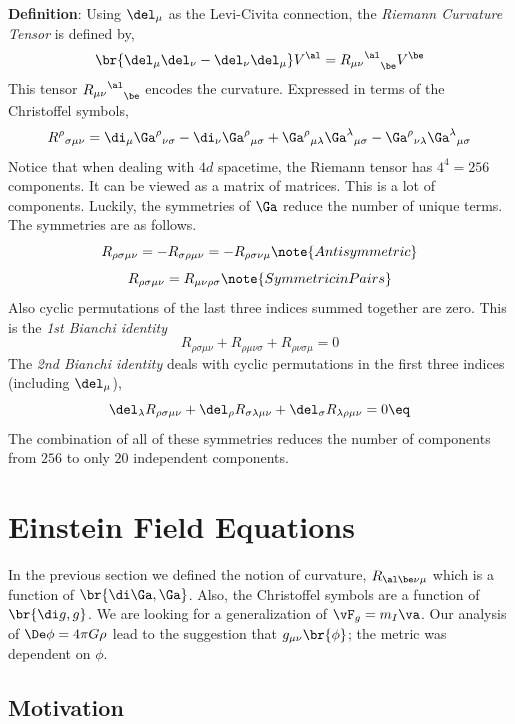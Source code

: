 \documentclass{article}
\begin{document}
\textbf{Definition}: Using $\del_\mu$ as the Levi-Civita connection, the \textit{Riemann Curvature Tensor} is defined by,
\[ \br{\del_\mu \del_\nu - \del_\nu \del_\mu} V^\al = {{R_{\mu\nu}}^\al}_\be V^\be \]
This tensor ${{R_{\mu\nu}}^\al}_\be$ encodes the curvature. Expressed in terms of the Christoffel symbols,
\[ {R^{\rho}}_{\sigma \mu \nu} = \di_\mu {\Ga^\rho}_{\nu\sigma}- \di_\nu {\Ga^\rho}_{\mu\sigma} + {\Ga^\rho}_{\mu\lambda}{\Ga^\lambda}_{\mu\sigma} - {\Ga^\rho}_{\nu\lambda}{\Ga^\lambda}_{\mu\sigma} \]
Notice that when dealing with $4d$ spacetime, the Riemann tensor has $4^4 = 256$ components. It can be viewed as a matrix of matrices. This is a lot of components. Luckily, the symmetries of $\Ga$ reduce the number of unique terms. The symmetries are as follows.
\[ R_{\rho \sigma \mu \nu} = - R_{\sigma \rho \mu \nu} = - R_{\rho \sigma \nu \mu} \note{Antisymmetric} \]
\[ R_{\rho \sigma \mu \nu} = R_{\mu \nu \rho \sigma } \note{Symmetric in Pairs} \]
Also cyclic permutations of the last three indices summed together are zero. This is the \textit{1st Bianchi identity}
\[ R_{\rho \sigma \mu \nu} + R_{\rho  \mu \nu\sigma} + R_{\rho  \nu\sigma \mu} = 0 \]
The \textit{2nd Bianchi identity} deals with cyclic permutations in the first three indices (including $\del_\mu$),
\[ \del_\lambda R_{\rho \sigma \mu \nu} + \del_\rho R_{ \sigma\lambda \mu \nu} + \del_\sigma R_{\lambda\rho  \mu \nu} = 0 \eq \label{eq:2ndbi}\]
The combination of all of these symmetries reduces the number of components from $256$ to only $20$ independent components.

\section{Einstein Field Equations}

In the previous section we defined the notion of curvature, $R_{\al\be\nu\mu}$ which is a function of $\br{\di \Ga , \Ga}$. Also, the Christoffel symbols are a function of $\br{\di g, g}$. We are looking for a generalization of $\vF_g = m_I \va$. Our analysis of $\De \phi = 4 \pi G \rho$ lead to the suggestion that $g_{\mu\nu}\br{\phi}$; the metric was dependent on $\phi$.

\subsection{Motivation}
\end{document}
